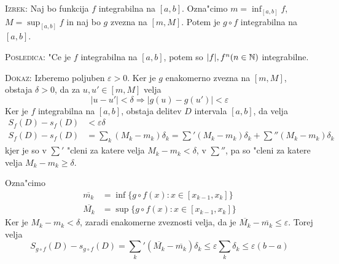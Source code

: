 \textsc{Izrek:} Naj bo funkcija $f$ integrabilna na $[a, b]$. Ozna"cimo $m = \inf_{[a, b]} f$, $M = \sup_{[a, b]}f$ in naj bo $g$ zvezna na $[m, M]$. Potem je $g \circ f$ integrabilna na $[a, b]$.

\textsc{Posledica:} "Ce je $f$ integrabilna na $[a, b]$, potem so $|f|, f^n (n \in \mathbb{N})$ integrabilne.

\textsc{Dokaz:} Izberemo poljuben $\varepsilon > 0$. Ker je $g$ enakomerno zvezna na $[m, M]$, obstaja $\delta > 0$, da za $u, u' \in [m, M]$ velja
\begin{equation*}
|u - u'| < \delta \Rightarrow |g(u) - g(u')| < \varepsilon
\end{equation*}
Ker je $f$ integrabilna na $[a, b]$, obstaja delitev $D$ intervala $[a, b]$, da velja
\begin{align*}
S_f(D) - s_f(D) &< \varepsilon \delta \\
S_f(D) - s_f(D) &= \sum_k (M_k - m_k) \delta_k = \sum'(M_k - m_k) \delta_k + \sum''(M_k - m_k) \delta_k
\end{align*}
kjer je so v $\sum'$ "cleni za katere velja $M_k - m_k < \delta$, v $\sum''$, pa so "cleni za katere velja $M_k - m_k \geq \delta$.

Ozna"cimo
\begin{align*}
\overline{m_k} &= \inf \{g \circ f (x): x \in [x_{k-1}, x_k]\} \\
\overline{M_k} &= \sup \{g \circ f (x): x \in [x_{k-1}, x_k]\}
\end{align*}
Ker je $M_k - m_k < \delta$, zaradi enakomerne zveznosti velja, da je $\overline{M_k} - \overline{m_k} \leq \varepsilon$. Torej velja
\begin{equation*}
S_{g \circ f} (D) - s_{g \circ f}(D) = \sum_k'(\overline{M_k} - \overline{m_k}) \delta_k \leq \varepsilon \sum_k \delta_k \leq \varepsilon (b-a)
\end{equation*}